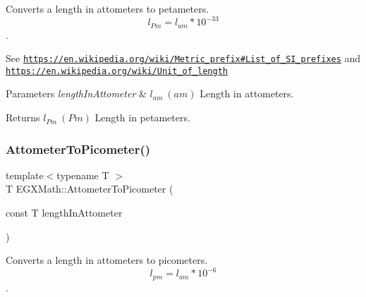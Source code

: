 Converts a length in attometers to petameters. \[ l_{Pm}=l_{am} * 10^{-33} \]. 

See \href{https://en.wikipedia.org/wiki/Metric_prefix#List_of_SI_prefixes}{\tt https\+://en.\+wikipedia.\+org/wiki/\+Metric\+\_\+prefix\#\+List\+\_\+of\+\_\+\+S\+I\+\_\+prefixes} and \href{https://en.wikipedia.org/wiki/Unit_of_length}{\tt https\+://en.\+wikipedia.\+org/wiki/\+Unit\+\_\+of\+\_\+length} 
\begin{DoxyParams}{Parameters}
{\em length\+In\+Attometer} & $ l_{am}\ (am)$ Length in attometers. \\
\hline
\end{DoxyParams}
\begin{DoxyReturn}{Returns}
$ l_{Pm}\ (Pm)$ Length in petameters. 
\end{DoxyReturn}
\mbox{\label{group___e_g_x_math-_conversions-_length_conversions-_s_i-_attometer-_s_i_ga46ccf47b501bffeb16bc792377e55991}} 
\subsubsection{\texorpdfstring{Attometer\+To\+Picometer()}{AttometerToPicometer()}}
{\footnotesize\ttfamily template$<$typename T $>$ \\
T E\+G\+X\+Math\+::\+Attometer\+To\+Picometer (\begin{DoxyParamCaption}\item[{const T}]{length\+In\+Attometer }\end{DoxyParamCaption})}



Converts a length in attometers to picometers. \[ l_{pm}=l_{am} * 10^{-6} \]. 

